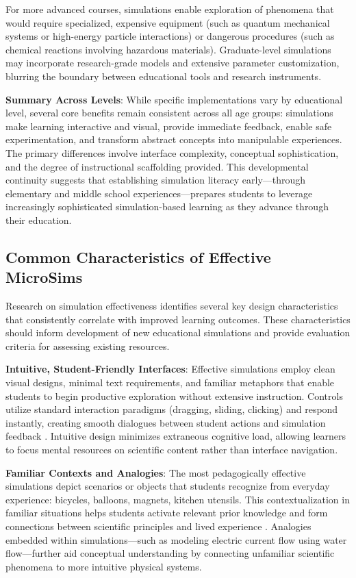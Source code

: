 For more advanced courses, simulations enable exploration of phenomena that would require specialized, expensive equipment (such as quantum mechanical systems or high-energy particle interactions) or dangerous procedures (such as chemical reactions involving hazardous materials). Graduate-level simulations may incorporate research-grade models and extensive parameter customization, blurring the boundary between educational tools and research instruments.

\textbf{Summary Across Levels}: While specific implementations vary by educational level, several core benefits remain consistent across all age groups: simulations make learning interactive and visual, provide immediate feedback, enable safe experimentation, and transform abstract concepts into manipulable experiences. The primary differences involve interface complexity, conceptual sophistication, and the degree of instructional scaffolding provided. This developmental continuity suggests that establishing simulation literacy early—through elementary and middle school experiences—prepares students to leverage increasingly sophisticated simulation-based learning as they advance through their education.

\subsection{Common Characteristics of Effective MicroSims}

Research on simulation effectiveness identifies several key design characteristics that consistently correlate with improved learning outcomes. These characteristics should inform development of new educational simulations and provide evaluation criteria for assessing existing resources.

\textbf{Intuitive, Student-Friendly Interfaces}: Effective simulations employ clean visual designs, minimal text requirements, and familiar metaphors that enable students to begin productive exploration without extensive instruction. Controls utilize standard interaction paradigms (dragging, sliding, clicking) and respond instantly, creating smooth dialogues between student actions and simulation feedback \cite{phet2023}. Intuitive design minimizes extraneous cognitive load, allowing learners to focus mental resources on scientific content rather than interface navigation.

\textbf{Familiar Contexts and Analogies}: The most pedagogically effective simulations depict scenarios or objects that students recognize from everyday experience: bicycles, balloons, magnets, kitchen utensils. This contextualization in familiar situations helps students activate relevant prior knowledge and form connections between scientific principles and lived experience \cite{phet2023}. Analogies embedded within simulations—such as modeling electric current flow using water flow—further aid conceptual understanding by connecting unfamiliar scientific phenomena to more intuitive physical systems.


